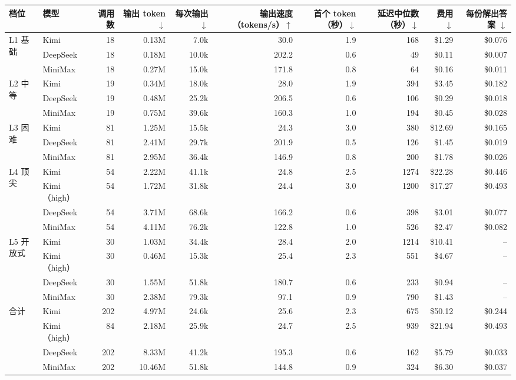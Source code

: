 \begin{tabular}{@{}llrrrrrrrr@{}}
\toprule
档位 & 模型 & 调用数 & 输出 token $\downarrow$ & 每次输出 $\downarrow$ & 输出速度（tokens/s）$\uparrow$ & 首个 token（秒）$\downarrow$ & 延迟中位数（秒）$\downarrow$ & 费用 $\downarrow$ & 每份解出答案 $\downarrow$ \\
\midrule
\multirow{3}{*}{L1 基础} & Kimi & 18 & 0.13M & 7.0k & 30.0 & 1.9 & 168 & \$1.29 & \$0.076 \\
 & DeepSeek & 18 & 0.18M & 10.0k & 202.2 & 0.6 & 49 & \$0.11 & \$0.007 \\
 & MiniMax & 18 & 0.27M & 15.0k & 171.8 & 0.8 & 64 & \$0.16 & \$0.011 \\
\cmidrule(lr){1-10}
\multirow{3}{*}{L2 中等} & Kimi & 19 & 0.34M & 18.0k & 28.0 & 1.9 & 394 & \$3.45 & \$0.182 \\
 & DeepSeek & 19 & 0.48M & 25.2k & 206.5 & 0.6 & 106 & \$0.29 & \$0.018 \\
 & MiniMax & 19 & 0.75M & 39.6k & 160.3 & 1.0 & 194 & \$0.45 & \$0.028 \\
\cmidrule(lr){1-10}
\multirow{3}{*}{L3 困难} & Kimi & 81 & 1.25M & 15.5k & 24.3 & 3.0 & 380 & \$12.69 & \$0.165 \\
 & DeepSeek & 81 & 2.41M & 29.7k & 201.9 & 0.5 & 126 & \$1.45 & \$0.019 \\
 & MiniMax & 81 & 2.95M & 36.4k & 146.9 & 0.8 & 200 & \$1.78 & \$0.026 \\
\cmidrule(lr){1-10}
\multirow{4}{*}{L4 顶尖} & Kimi & 54 & 2.22M & 41.1k & 24.8 & 2.5 & 1274 & \$22.28 & \$0.446 \\
 & Kimi（high） & 54 & 1.72M & 31.8k & 24.4 & 3.0 & 1200 & \$17.27 & \$0.493 \\
 & DeepSeek & 54 & 3.71M & 68.6k & 166.2 & 0.6 & 398 & \$3.01 & \$0.077 \\
 & MiniMax & 54 & 4.11M & 76.2k & 122.8 & 1.0 & 526 & \$2.47 & \$0.082 \\
\cmidrule(lr){1-10}
\multirow{4}{*}{L5 开放式} & Kimi & 30 & 1.03M & 34.4k & 28.4 & 2.0 & 1214 & \$10.41 & -- \\
 & Kimi（high） & 30 & 0.46M & 15.3k & 25.4 & 2.3 & 551 & \$4.67 & -- \\
 & DeepSeek & 30 & 1.55M & 51.8k & 180.7 & 0.6 & 233 & \$0.94 & -- \\
 & MiniMax & 30 & 2.38M & 79.3k & 97.1 & 0.9 & 790 & \$1.43 & -- \\
\cmidrule(lr){1-10}
\multirow{4}{*}{合计} & Kimi & 202 & 4.97M & 24.6k & 25.6 & 2.3 & 675 & \$50.12 & \$0.244 \\
 & Kimi（high） & 84 & 2.18M & 25.9k & 24.7 & 2.5 & 939 & \$21.94 & \$0.493 \\
 & DeepSeek & 202 & 8.33M & 41.2k & 195.3 & 0.6 & 162 & \$5.79 & \$0.033 \\
 & MiniMax & 202 & 10.46M & 51.8k & 144.8 & 0.9 & 324 & \$6.30 & \$0.037 \\
\bottomrule
\end{tabular}
